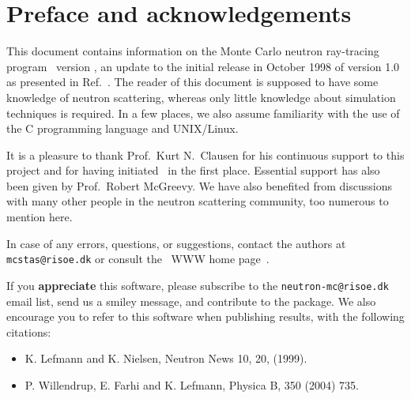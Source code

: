 
\chapter*{Preface and acknowledgements}
This document contains information on the Monte Carlo neutron
ray-tracing program \MCS\ version \version, an update to the initial
release in October 1998 of version 1.0 as presented in Ref.~\cite{nn_10_20}. The reader of this
document is supposed to have some knowledge of neutron scattering,
whereas only little knowledge about simulation techniques is
required. In a few places, we also assume familiarity with the
use of the C programming language and UNIX/Linux.

It is a pleasure to thank Prof.~Kurt N.~Clausen for his continuous
support to this project and for having initiated \MCS\ in the first
place. Essential support has also been given by Prof.~Robert McGreevy.
We have also benefited
from discussions with many other people in the neutron scattering
community, too numerous to mention here.


In case of any errors, questions, or suggestions, %
contact the authors at \verb+mcstas@risoe.dk+
or consult the \MCS\ WWW home page~\cite{mcstas_webpage}.

If you {\bf appreciate} this software, please subscribe to the \verb+neutron-mc@risoe.dk+ email list, send us a smiley message, and contribute to the package. We also encourage you to refer to this software when publishing results, with the following citations:
\begin{itemize}
\item{K. Lefmann and K. Nielsen, Neutron News 10, 20, (1999).}
\item{P. Willendrup, E. Farhi and K. Lefmann, Physica B, 350 (2004) 735.}
\end{itemize}


